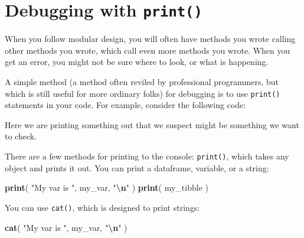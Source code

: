 \documentclass[
]{book}
\newenvironment{Shaded}{\begin{snugshade}}{\end{snugshade}}
\newcommand{\ControlFlowTok}[1]{\textcolor[rgb]{0.13,0.29,0.53}{\textbf{#1}}}
\newcommand{\FunctionTok}[1]{\textcolor[rgb]{0.13,0.29,0.53}{\textbf{#1}}}
\newcommand{\NormalTok}[1]{#1}
\newcommand{\SpecialCharTok}[1]{\textcolor[rgb]{0.81,0.36,0.00}{\textbf{#1}}}
\newcommand{\StringTok}[1]{\textcolor[rgb]{0.31,0.60,0.02}{#1}}
\begin{document}
\section{\texorpdfstring{Debugging with \texttt{print()}}{Debugging with print()}}\label{about-print}

When you follow modular design, you will often have methods you wrote calling other methods you wrote, which call even more methods you wrote.
When you get an error, you might not be sure where to look, or what is happening.

A simple method (a method often reviled by professional programmers, but which is still useful for more ordinary folks) for debugging is to use \texttt{print()} statements in your code.
For example, consider the following code:

\begin{Shaded}
\end{Shaded}

Here we are printing something out that we suspect might be something we want to check.

There are a few methods for printing to the console: \texttt{print()}, which takes any object and prints it out. You can print a dataframe, variable, or a string:

\begin{Shaded}
\begin{Highlighting}[]
\FunctionTok{print}\NormalTok{( }\StringTok{"My var is "}\NormalTok{, my\_var, }\StringTok{"}\SpecialCharTok{\textbackslash{}n}\StringTok{"}\NormalTok{ )}
\FunctionTok{print}\NormalTok{( my\_tibble )}
\end{Highlighting}
\end{Shaded}

You can use \texttt{cat()}, which is designed to print strings:

\begin{Shaded}
\begin{Highlighting}[]
\FunctionTok{cat}\NormalTok{( }\StringTok{"My var is "}\NormalTok{, my\_var, }\StringTok{"}\SpecialCharTok{\textbackslash{}n}\StringTok{"}\NormalTok{ )}
\end{Highlighting}
\end{Shaded}
\end{document}
